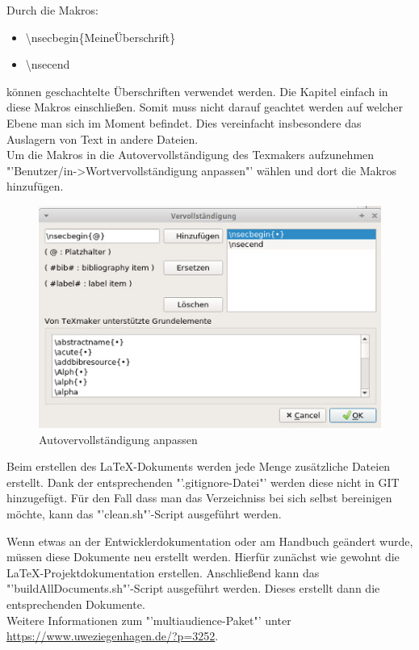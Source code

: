 Durch die Makros:
\begin{itemize}
\item \textbackslash nsecbegin\{MeineÜberschrift\}
\item \textbackslash nsecend
\end{itemize}
können geschachtelte Überschriften verwendet werden. Die Kapitel einfach in diese Makros einschließen. Somit muss nicht darauf geachtet werden auf welcher Ebene man sich im Moment befindet. Dies vereinfacht insbesondere das Auslagern von Text in andere Dateien.\\
Um die Makros in die Autovervollständigung des Texmakers aufzunehmen "'Benutzer/in->Wortvervollständigung anpassen"' wählen und dort die Makros hinzufügen.
\begin{figure}[hbtp]
\centering
\includegraphics[scale=0.4]{Bilder/autocompleteMakro}
\caption{Autovervollständigung anpassen}
\end{figure}
\nsecend

Beim erstellen des LaTeX-Dokuments werden jede Menge zusätzliche Dateien erstellt. Dank der entsprechenden "'.gitignore-Datei"' werden diese nicht in GIT hinzugefügt. Für den Fall dass man das Verzeichniss bei sich selbst bereinigen möchte, kann das "'clean.sh"'-Script ausgeführt werden.
\nsecend

Wenn etwas an der Entwicklerdokumentation oder am Handbuch geändert wurde, müssen diese Dokumente neu erstellt werden. Hierfür zunächst wie gewohnt die LaTeX-Projektdokumentation erstellen. Anschließend kann das "'buildAllDocuments.sh"'-Script ausgeführt werden. Dieses erstellt dann die entsprechenden Dokumente.\\
Weitere Informationen zum "'multiaudience-Paket"' unter \url{https://www.uweziegenhagen.de/?p=3252}.
\nsecend
\nsecend

\nsecend